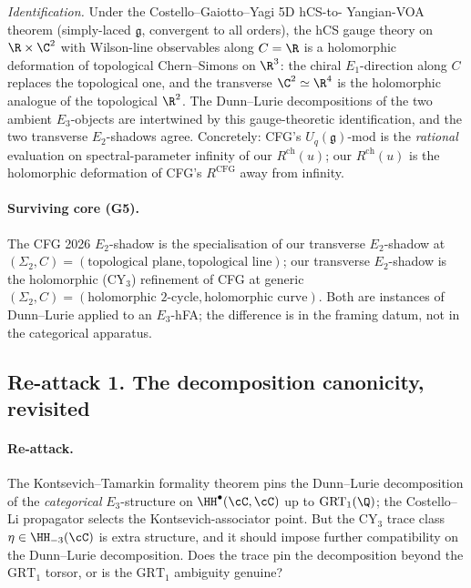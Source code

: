 \emph{Identification.}  Under the Costello--Gaiotto--Yagi 5D hCS-to-
Yangian-VOA theorem (simply-laced $\mathfrak g$, convergent to all
orders), the hCS gauge theory on $\R \times \C^2$ with Wilson-line
observables along $C = \R$ is a holomorphic deformation of
topological Chern--Simons on $\R^3$: the chiral $E_1$-direction along
$C$ replaces the topological one, and the transverse $\C^2 \simeq \R^4$
is the holomorphic analogue of the topological $\R^2$.  The
Dunn--Lurie decompositions of the two ambient $E_3$-objects are
intertwined by this gauge-theoretic identification, and the two
transverse $E_2$-shadows agree.  Concretely: CFG's $U_q(\mathfrak g)$-mod
is the \emph{rational} evaluation on spectral-parameter infinity of
our $R^{\mathrm{ch}}(u)$; our $R^{\mathrm{ch}}(u)$ is the
holomorphic deformation of CFG's $R^{\mathrm{CFG}}$ away from infinity.

\paragraph{Surviving core (G5).}  The CFG 2026 $E_2$-shadow is the
specialisation of our transverse $E_2$-shadow at
$(\Sigma_2, C) = (\text{topological plane}, \text{topological line})$;
our transverse $E_2$-shadow is the holomorphic (CY$_3$) refinement of
CFG at generic $(\Sigma_2, C) = (\text{holomorphic } 2\text{-cycle},
\text{holomorphic curve})$.  Both are instances of Dunn--Lurie applied
to an $E_3$-hFA; the difference is in the framing datum, not in the
categorical apparatus.


\subsection*{Re-attack 1.  The decomposition canonicity, revisited}

\paragraph{Re-attack.}  The Kontsevich--Tamarkin formality theorem
pins the Dunn--Lurie decomposition of the \emph{categorical}
$E_3$-structure on $\HH^\bullet(\cC, \cC)$ up to
$\mathrm{GRT}_1(\Q)$; the Costello--Li propagator selects the
Kontsevich-associator point.  But the CY$_3$ trace class
$\eta \in \HH_{-3}(\cC)$ is extra structure, and it should impose
further compatibility on the Dunn--Lurie decomposition.  Does the
trace pin the decomposition beyond the $\mathrm{GRT}_1$ torsor, or is
the $\mathrm{GRT}_1$ ambiguity genuine?

